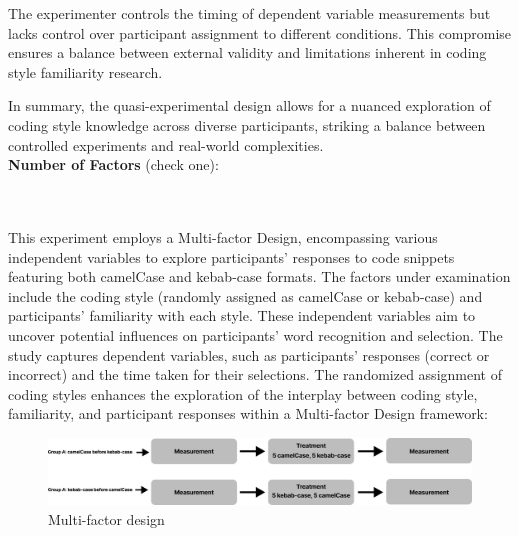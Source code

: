 \documentclass{article}
\begin{document}
The experimenter controls the timing of dependent variable measurements but lacks control over participant assignment to different conditions. This compromise ensures a balance between external validity and limitations inherent in coding style familiarity research.

In summary, the quasi-experimental design allows for a nuanced exploration of coding style knowledge across diverse participants, striking a balance between controlled experiments and real-world complexities.
\\


\textbf{Number of Factors} (check one):\\
\noindent
\begin{minipage}{0.4\textwidth}
\end{minipage}%
\begin{minipage}{0.4\textwidth}
\end{minipage}%
\begin{minipage}{0.0\textwidth}
\end{minipage}\\\\
This experiment employs a Multi-factor Design, encompassing various independent variables to explore participants' responses to code snippets featuring both camelCase and kebab-case formats. The factors under examination include the coding style (randomly assigned as camelCase or kebab-case) and participants' familiarity with each style. These independent variables aim to uncover potential influences on participants' word recognition and selection. The study captures dependent variables, such as participants' responses (correct or incorrect) and the time taken for their selections. The randomized assignment of coding styles enhances the exploration of the interplay between coding style, familiarity, and participant responses within a Multi-factor Design framework:\\
\begin{figure}[H]
    \centering
    \includegraphics[width=1\textwidth]{graphExperiment2.png}
    \caption{Multi-factor design}
\end{figure}
\end{document}

